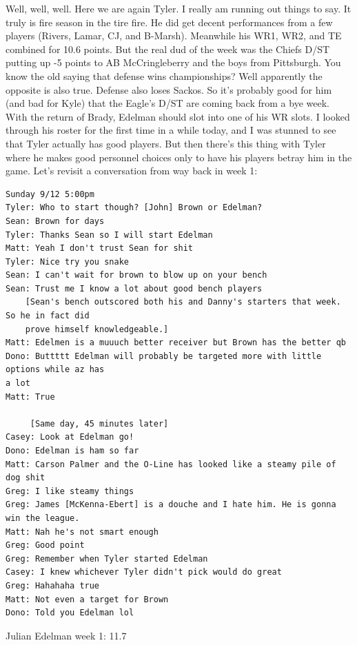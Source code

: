 \documentclass[11pt,letterpaper]{article}
\begin{document}
\par\noindent Well, well, well. Here we are again Tyler. I really am running out things to say. It truly is fire season in the tire fire. He did get decent performances from a few players (Rivers, Lamar, CJ, and B-Marsh). Meanwhile his WR1, WR2, and TE combined for 10.6 points. But the real dud of the week was the Chiefs D/ST putting up -5 points to AB McCringleberry and the boys from Pittsburgh. You know the old saying that defense wins championships? Well apparently the opposite is also true. Defense also loses Sackos. So it's probably good for him (and bad for Kyle) that the Eagle's D/ST are coming back from a bye week. With the return of Brady, Edelman should slot into one of his WR slots. I looked through his roster for the first time in a while today, and I was stunned to see that Tyler actually has good players. But then there's this thing with Tyler where he makes good personnel choices only to have his players betray him in the game. Let's revisit a conversation from way back in week 1:
\begin{verbatim}
Sunday 9/12 5:00pm
Tyler: Who to start though? [John] Brown or Edelman?
Sean: Brown for days
Tyler: Thanks Sean so I will start Edelman
Matt: Yeah I don't trust Sean for shit
Tyler: Nice try you snake
Sean: I can't wait for brown to blow up on your bench
Sean: Trust me I know a lot about good bench players 
    [Sean's bench outscored both his and Danny's starters that week. So he in fact did
    prove himself knowledgeable.]
Matt: Edelmen is a muuuch better receiver but Brown has the better qb
Dono: Buttttt Edelman will probably be targeted more with little options while az has
a lot
Matt: True

     [Same day, 45 minutes later]
Casey: Look at Edelman go!
Dono: Edelman is ham so far
Matt: Carson Palmer and the O-Line has looked like a steamy pile of dog shit
Greg: I like steamy things
Greg: James [McKenna-Ebert] is a douche and I hate him. He is gonna win the league.
Matt: Nah he's not smart enough
Greg: Good point
Greg: Remember when Tyler started Edelman
Casey: I knew whichever Tyler didn't pick would do great
Greg: Hahahaha true
Matt: Not even a target for Brown
Dono: Told you Edelman lol
\end{verbatim}
\vspace{10pt}\par\noindent Julian Edelman week 1: 11.7
\end{document}

